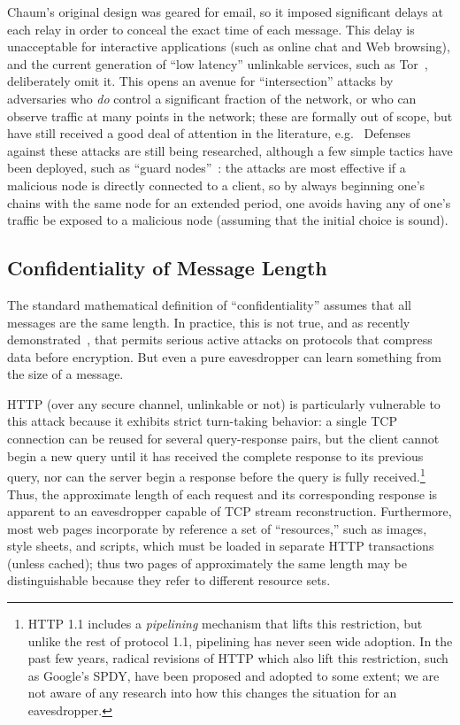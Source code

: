 \documentclass[oneside]{zarticle}
\begin{document}
\begin{multicols}{2}
Chaum's original design was geared for email, so it imposed
significant delays at each relay in order to conceal the exact time of
each message.  This delay is unacceptable for interactive applications
(such as online chat and Web browsing), and the current generation of
“low latency” unlinkable services, such as
Tor~\cite{dingledine2004tor}, deliberately omit it.  This opens an
avenue for “intersection” attacks by adversaries who \emph{do} control
a significant fraction of the network, or who can observe traffic at
many points in the network; these are formally out of scope, but have
still received a good deal of attention in the literature,
e.g.~\cite{danezis2003statistical, danezis2004continuous,
  danezis2005statistical, danezis2007twosided, murdoch2007sampled,
  shmatikov2006timing, overlier2006locating} Defenses against these
attacks are still being researched, although a few simple tactics have
been deployed, such as “guard nodes”~\cite{overlier2006locating}: the
attacks are most effective if a malicious node is directly connected
to a client, so by always beginning one's chains with the same node
for an extended period, one avoids having any of one's traffic be
exposed to a malicious node (assuming that the initial choice is
sound).

\subsection{Confidentiality of Message Length}

The standard mathematical definition of “confidentiality” assumes that
all messages are the same length.  In practice, this is not true, and
as recently demonstrated~\cite{duong2012crime,gluck2013breach}, that
permits serious active attacks on protocols that compress data before
encryption.  But even a pure eavesdropper can learn something from the
size of a message.

HTTP (over any secure channel, unlinkable or not) is particularly
vulnerable to this attack because it exhibits strict turn-taking
behavior: a single TCP connection can be reused for several
query-response pairs, but the client cannot begin a new query until it
has received the complete response to its previous query, nor can the
server begin a response before the query is fully
received.\footnote{HTTP 1.1 includes a \emph{pipelining} mechanism
  that lifts this restriction, but unlike the rest of protocol 1.1,
  pipelining has never seen wide adoption.  In the past few years,
  radical revisions of HTTP which also lift this restriction, such as
  Google's SPDY, have been proposed and adopted to some extent; we are
  not aware of any research into how this changes the situation for an
  eavesdropper.}  Thus, the approximate length of each request and its
corresponding response is apparent to an eavesdropper capable of TCP
stream reconstruction.  Furthermore, most web pages incorporate by
reference a set of “resources,” such as images, style sheets, and
scripts, which must be loaded in separate HTTP transactions (unless
cached); thus two pages of approximately the same length may be
distinguishable because they refer to different resource sets.


\end{multicols}
\end{document}
